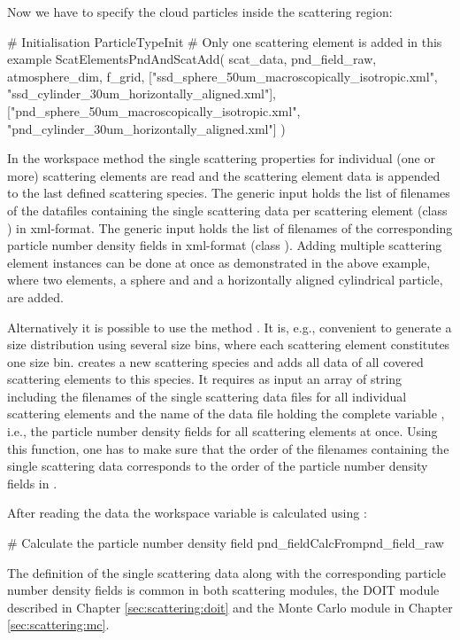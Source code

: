Now we have to specify the cloud particles inside the scattering
region:
\begin{code}
# Initialisation
ParticleTypeInit
# Only one scattering element is added in this example 
ScatElementsPndAndScatAdd( scat_data, pnd_field_raw,
                 atmosphere_dim, f_grid,
                 ["ssd_sphere_50um_macroscopically_isotropic.xml",
                  "ssd_cylinder_30um_horizontally_aligned.xml"],
                 ["pnd_sphere_50um_macroscopically_isotropic.xml",
                  "pnd_cylinder_30um_horizontally_aligned.xml"] )
\end{code}
In the workspace method  the single
scattering properties for individual (one or more) scattering elements are read
and the scattering element data is appended to the last defined scattering
species.
The generic input  holds the list of filenames
of the datafiles containing the single scattering data per scattering element
(class ) in xml-format. The generic input
 holds the list of filenames of the
corresponding particle number density fields in xml-format (class
). Adding multiple scattering element instances can be done
at once as demonstrated in the above example, where two elements, a sphere and
and a horizontally aligned cylindrical particle, are added.

Alternatively it is possible to use the method
. It is, e.g., convenient to generate a size
distribution using several size bins, where each scattering element constitutes
one size bin.  creates a new scattering
species and adds all data of all covered scattering elements to this species. It
requires as input an array of string including the filenames of the single
scattering data files for all individual scattering elements and the name of the
data file holding the complete variable , i.e., the
particle number density fields for all scattering elements at once. Using this
function, one has to make sure that the order of the filenames containing the
single scattering data corresponds to the order of the particle number density
fields in .

After reading the data the workspace variable  is
calculated using : 
\begin{code}
# Calculate the particle number density field
pnd_fieldCalcFrompnd_field_raw
\end{code}

The definition of the single scattering data along with the
corresponding particle number density fields is common in both
scattering modules, the DOIT module described in 
Chapter \ref{sec:scattering:doit} and the Monte Carlo module in
Chapter \ref{sec:scattering:mc}.


